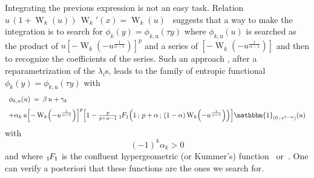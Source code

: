 \documentclass[entropy,article,submit,moreauthors,pdftex]{Definitions/mdpi}
\newcommand{\SZ}[1]{{\color{blue} #1}}                                       %
\def\un{\mathbbm{1}}%
\def\W{\operatorname{W}} %
\newcommand{\hypgeom}[2]{\mbox{}_{#1}\hspace{-1pt}F_{#2}}%
\begin{document}
Integrating  the previous  expression  is  not an  easy  task.   Relation $u  \,
(1+\W_k(u)) \, \W_k'(x) =  \W_k(u)$~\cite[Eq.~3.2]{CorGon96} suggests that a way
to make the  integration is to search for  $\phi_k(y) = \phi_{k,\mathrm{u}}(\tau
y)$  where $\phi_{k,\mathrm{u}}(u)$  is searched  as the  product of  $u \left[-
  \W_k\left(  -  u^{\frac{1}{\alpha-1}} \right)  \right]^p  $  and a  series  of
$\left[  - \W_k\left(  -  u^{\frac{1}{\alpha-1}} \right)  \right]$  and then  to
recognize  the  coefficients  of  the  series. Such  an  approach\SZ{,  after  a
  reparametrization  of  the $\lambda_i$s,}  leads  to  the family  of  entropic
functional $\phi_k(y) = \phi_{k,\mathrm{u}}(\tau y)$ with
%
\[\begin{array}{l}
\phi_{k,\mathrm{u}}(u) \: = \: \beta \, u + \gamma_k \\[2.5mm]
%
+  \alpha_k \,     u   \left[    -   \W_k\left(   -
  u^{\frac{1}{\alpha-1}} \right) \right]^p \left[ 1 - \frac{p}{p+\alpha-1} \,
  \hypgeom{1}{1}\left(  1 \,  ; \,  p+\alpha \,  ; \,  (1-\alpha) \W_k  \left( -
  u^{\frac{1}{\alpha-1}}  \right)   \right)  \right]  \un_{\left(  0   \,  ;  \,
  e^{1-\alpha} \right)}(u)
\end{array}\]
%
\SZ{with $$(-1)^k  \alpha_k > 0$$  and where $\hypgeom{1}{1}$ is  the confluent
hypergeometric (or Kummer's) function~\cite[\S~13]{AbrSte70} or~\cite[\S~9.2]{GraRyz15}}.
One  can
verify  a posteriori  that these  functions  are the  ones we  search for.
\end{document}
